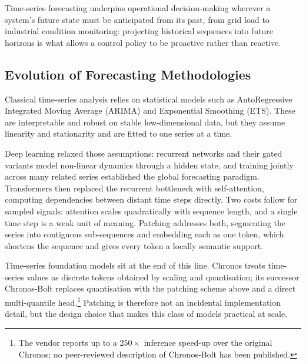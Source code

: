 Time-series forecasting underpins operational decision-making wherever a system's future state must be anticipated from its past, from grid load to industrial condition monitoring: projecting historical sequences into future horizons is what allows a control policy to be proactive rather than reactive\autocite{hyndmanForecastingPrinciplesPractice2021}.

\subsection{Evolution of Forecasting Methodologies}
Classical time-series analysis relies on statistical models such as AutoRegressive Integrated Moving Average (ARIMA) and Exponential Smoothing (ETS)\autocite{hyndmanForecastingPrinciplesPractice2021}. These are interpretable and robust on stable low-dimensional data, but they assume linearity and stationarity and are fitted to one series at a time.

Deep learning relaxed those assumptions: recurrent networks and their gated variants\autocite{hochreiterLongShortTermMemory1997} model non-linear dynamics through a hidden state, and training jointly across many related series established the global forecasting paradigm\autocite{benidisDeepLearningTime2022}. Transformers then replaced the recurrent bottleneck with self-attention\autocite{vaswaniAttentionAllYou2017}, computing dependencies between distant time steps directly. Two costs follow for sampled signals: attention scales quadratically with sequence length, and a single time step is a weak unit of meaning. Patching addresses both, segmenting the series into contiguous sub-sequences and embedding each as one token, which shortens the sequence and gives every token a locally semantic support\autocite{nieTimeSeriesWorth2023}.

Time-series foundation models sit at the end of this line. Chronos treats time-series values as discrete tokens obtained by scaling and quantisation\autocite{ansariChronosLearningLanguage2024}; its successor Chronos-Bolt replaces quantisation with the patching scheme above and a direct multi-quantile head\autocite{ansariChronosLearningLanguage2024a}.\footnote{The vendor reports up to a $250\times$ inference speed-up over the original Chronos\autocite{FastAccurateZeroshot2024a}; no peer-reviewed description of Chronos-Bolt has been published.} Patching is therefore not an incidental implementation detail, but the design choice that makes this class of models practical at scale.

